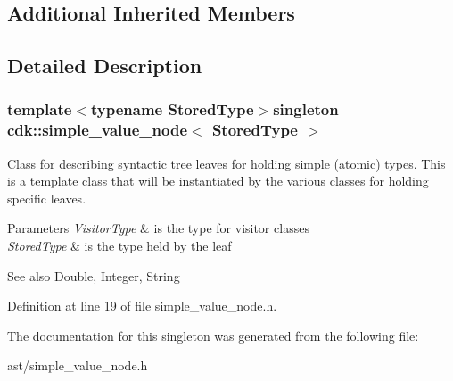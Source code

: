 \subsection*{Additional Inherited Members}


\subsection{Detailed Description}
\subsubsection*{template$<$typename Stored\+Type$>$singleton cdk\+::simple\+\_\+value\+\_\+node$<$ Stored\+Type $>$}

Class for describing syntactic tree leaves for holding simple (atomic) types. This is a template class that will be instantiated by the various classes for holding specific leaves.


\begin{DoxyParams}{Parameters}
{\em Visitor\+Type} & is the type for visitor classes \\
\hline
{\em Stored\+Type} & is the type held by the leaf \\
\hline
\end{DoxyParams}
\begin{DoxySeeAlso}{See also}
Double, Integer, String 
\end{DoxySeeAlso}


Definition at line 19 of file simple\+\_\+value\+\_\+node.\+h.



The documentation for this singleton was generated from the following file\+:\begin{DoxyCompactItemize}
\item 
ast/simple\+\_\+value\+\_\+node.\+h\end{DoxyCompactItemize}
